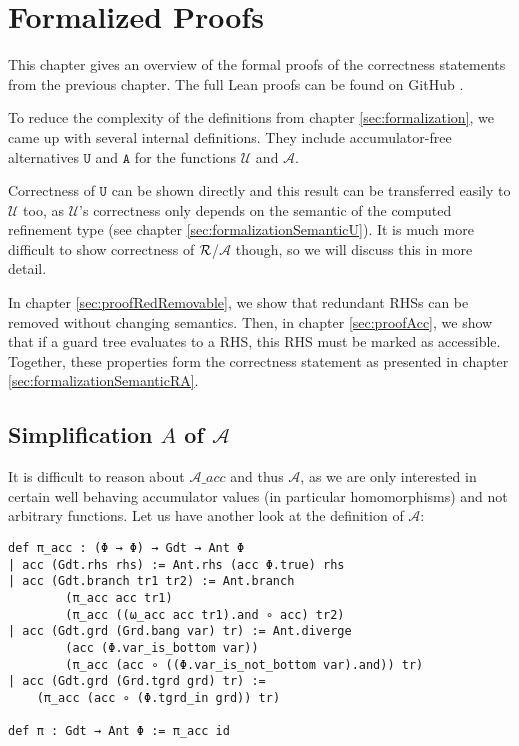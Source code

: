\chapter{Formalized Proofs}\label{sec:proof}

This chapter gives an overview of the formal proofs of the correctness statements from the previous chapter.
The full Lean proofs can be found on GitHub \cite{leanProof}.


To reduce the complexity of the definitions from chapter \ref{sec:formalization}, we came up with several internal definitions.
They include accumulator-free alternatives $\mathtt{U}$ and $\mathtt{A}$ for the functions $\mathcal{U}$ and $\mathcal{A}$.


Correctness of $\mathtt{U}$ can be shown directly and this result can be transferred easily to $\mathcal{U}$ too, as $\mathcal{U}$'s correctness only depends on the semantic of the computed refinement type (see chapter \ref{sec:formalizationSemanticU}).
It is much more difficult to show correctness of $\mathcal{R}$/$\mathcal{A}$ though, so we will discuss this in more detail.

In chapter \ref{sec:proofRedRemovable}, we show that redundant RHSs can be removed without changing semantics.
Then, in chapter \ref{sec:proofAcc}, we show that if a guard tree evaluates to a RHS, this RHS must be marked as accessible. Together, these properties form the correctness statement as presented in chapter \ref{sec:formalizationSemanticRA}.

\section{Simplification $A$ of $\mathcal{A}$}\label{chap:A_A}

It is difficult to reason about $\mathcal{A}\_acc$ and thus $\mathcal{A}$,
as we are only interested in certain well behaving accumulator values (in particular homomorphisms) and not arbitrary functions.
Let us have another look at the definition of $\mathcal{A}$:

\begin{verbatim}
def π_acc : (Φ → Φ) → Gdt → Ant Φ
| acc (Gdt.rhs rhs) := Ant.rhs (acc Φ.true) rhs
| acc (Gdt.branch tr1 tr2) := Ant.branch
        (π_acc acc tr1)
        (π_acc ((ω_acc acc tr1).and ∘ acc) tr2)
| acc (Gdt.grd (Grd.bang var) tr) := Ant.diverge
        (acc (Φ.var_is_bottom var)) 
        (π_acc (acc ∘ ((Φ.var_is_not_bottom var).and)) tr)
| acc (Gdt.grd (Grd.tgrd grd) tr) :=
    (π_acc (acc ∘ (Φ.tgrd_in grd)) tr)

def π : Gdt → Ant Φ := π_acc id
\end{verbatim}

